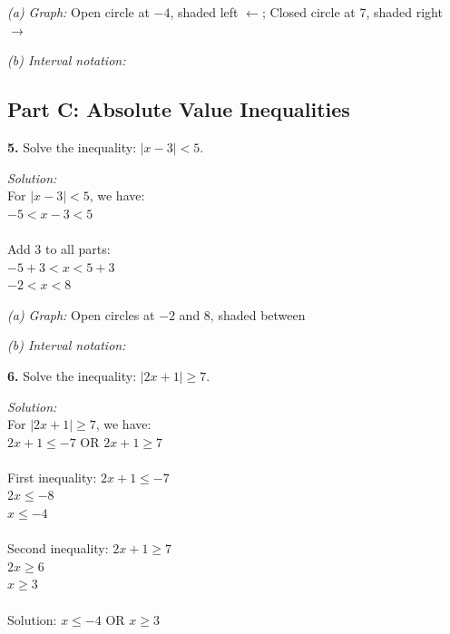 \documentclass[12pt]{article}
\begin{document}
                \textit{(a) Graph:} Open circle at $-4$, shaded left $\leftarrow$; Closed circle at 7, shaded right $\rightarrow$

                \textit{(b) Interval notation:} \fbox{$(-\infty, -4) \cup [7, \infty)$}

                \newpage

        \subsection*{Part C: Absolute Value Inequalities}

            \textbf{5.} Solve the inequality: $|x - 3| < 5$.

                \textit{Solution:}\\
                For $|x - 3| < 5$, we have:\\
                $-5 < x - 3 < 5$\\
                \\
                Add 3 to all parts:\\
                $-5 + 3 < x < 5 + 3$\\
                $-2 < x < 8$

                \textit{(a) Graph:} Open circles at $-2$ and 8, shaded between

                \textit{(b) Interval notation:} 

                \vspace{0.5cm}

            \textbf{6.} Solve the inequality: $|2x + 1| \geq 7$.

                \textit{Solution:}\\
                For $|2x + 1| \geq 7$, we have:\\
                $2x + 1 \leq -7$ OR $2x + 1 \geq 7$\\
                \\
                First inequality: $2x + 1 \leq -7$\\
                $2x \leq -8$\\
                $x \leq -4$\\
                \\
                Second inequality: $2x + 1 \geq 7$\\
                $2x \geq 6$\\
                $x \geq 3$\\
                \\
                Solution: $x \leq -4$ OR $x \geq 3$
\end{document}
